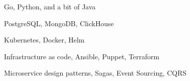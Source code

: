 \item Go, Python, and a bit of Java
\item PostgreSQL, MongoDB, ClickHouse
\item Kubernetes, Docker, Helm
\item Infrastructure as code, Ansible, Puppet, Terraform
\item Microservice design patterns, Sagas, Event Sourcing, CQRS

